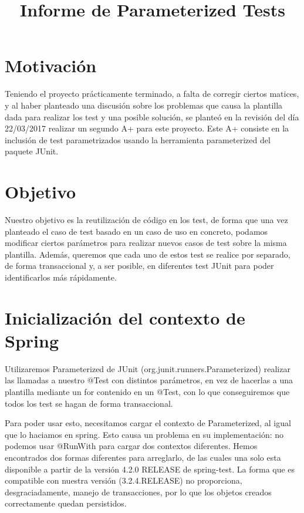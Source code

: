 \documentclass[a4paper]{article}
\title{Informe de Parameterized Tests}
\date{}
\begin{document}
\setlength{\voffset}{-1in}
\setlength{\textheight}{680px}
\setlength{\headsep}{30px}
\maketitle

\section{Motivación}

Teniendo el proyecto prácticamente terminado, a falta de corregir ciertos matices, y al haber planteado una discusión sobre los problemas que causa la plantilla dada para realizar los test y una posible solución, se planteó en la revisión del día 22/03/2017 realizar un segundo A+ para este proyecto. Este A+ consiste en la inclusión de test parametrizados usando la herramienta parameterized del paquete JUnit.

\section{Objetivo}

Nuestro objetivo es la reutilización de código en los test, de forma que una vez planteado el caso de test basado en un caso de uso en concreto, podamos modificar ciertos parámetros para realizar nuevos casos de test sobre la misma plantilla. Además, queremos que cada uno de estos test se realice por separado, de forma transaccional y, a ser posible, en diferentes test JUnit para poder identificarlos más rápidamente.

\section{Inicialización del contexto de Spring}

Utilizaremos Parameterized de JUnit (org.junit.runners.Parameterized) realizar las llamadas a nuestro @Test con distintos parámetros, en vez de hacerlas a una plantilla mediante un for contenido en un @Test, con lo que conseguiremos que todos los test se hagan de forma transaccional. 

Para poder usar esto, necesitamos cargar el contexto de Parameterized, al igual que lo haciamos en spring. Esto causa un problema en su implementación: no podemos usar @RunWith para cargar dos contextos diferentes. Hemos encontrados dos formas diferentes para arreglarlo, de las cuales una solo esta disponible a partir de la versión 4.2.0 RELEASE de spring-test. La forma que es compatible con nuestra versión (3.2.4.RELEASE) no proporciona, desgraciadamente, manejo de transacciones, por lo que los objetos creados correctamente quedan persistidos. 
\end{document}
